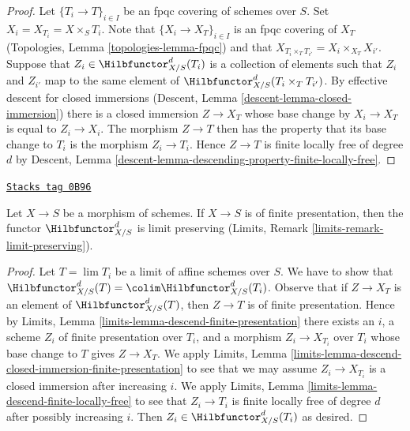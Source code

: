 \begin{proof}
Let $\{T_i \to T\}_{i \in I}$ be an fpqc covering of schemes over $S$.
Set $X_i = X_{T_i} = X \times_S T_i$.
Note that $\{X_i \to X_T\}_{i \in I}$ is an fpqc covering of
$X_T$ (Topologies, Lemma \ref{topologies-lemma-fpqc})
and that $X_{T_i \times_T T_{i'}} = X_i \times_{X_T} X_{i'}$.
Suppose that $Z_i \in \Hilbfunctor^d_{X/S}(T_i)$ is a collection of
elements such that $Z_i$ and $Z_{i'}$ map to the same element of
$\Hilbfunctor^d_{X/S}(T_i \times_T T_{i'})$. By effective descent
for closed immersions (Descent, Lemma \ref{descent-lemma-closed-immersion})
there is a closed immersion $Z \to X_T$ whose base change by
$X_i \to X_T$ is equal to $Z_i \to X_i$. The morphism $Z \to T$
then has the property that its base change to $T_i$ is the morphism
$Z_i \to T_i$. Hence $Z \to T$ is finite locally free of degree $d$
by Descent, Lemma \ref{descent-lemma-descending-property-finite-locally-free}.
\end{proof}

\begin{lemma}
\label{pic-lemma-hilb-d-limit-preserving}
\href{https://stacks.math.columbia.edu/tag/0B96}{\texttt{Stacks tag 0B96}}

Let $X \to S$ be a morphism of schemes. If $X \to S$ is
of finite presentation, then the functor $\Hilbfunctor^d_{X/S}$
is limit preserving (Limits, Remark \ref{limits-remark-limit-preserving}).
\end{lemma}

\begin{proof}
Let $T = \lim T_i$ be a limit of affine schemes over $S$. We have to show
that $\Hilbfunctor^d_{X/S}(T) = \colim \Hilbfunctor^d_{X/S}(T_i)$.
Observe that if $Z \to X_T$ is an element of $\Hilbfunctor^d_{X/S}(T)$,
then $Z \to T$ is of finite presentation. Hence by
Limits, Lemma \ref{limits-lemma-descend-finite-presentation}
there exists an $i$, a scheme $Z_i$ of finite presentation over $T_i$,
and a morphism $Z_i \to X_{T_i}$ over $T_i$ whose base change to $T$
gives $Z \to X_T$. We apply Limits, Lemma
\ref{limits-lemma-descend-closed-immersion-finite-presentation}
to see that we may assume $Z_i \to X_{T_i}$ is a closed immersion
after increasing $i$.
We apply Limits, Lemma \ref{limits-lemma-descend-finite-locally-free}
to see that $Z_i \to T_i$ is finite locally free of degree $d$
after possibly increasing $i$.
Then $Z_i \in \Hilbfunctor^d_{X/S}(T_i)$ as desired.
\end{proof}

